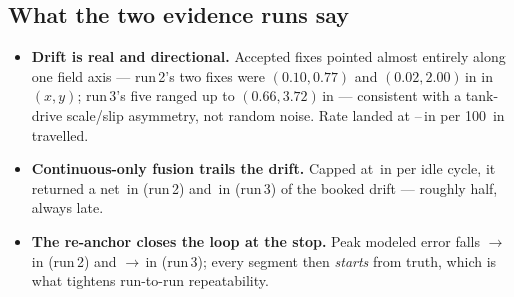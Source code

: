 \documentclass[11pt]{article}
\begin{document}
\subsection{What the two evidence runs say}
\begin{itemize}
  \item \textbf{Drift is real and directional.} Accepted fixes pointed almost
  entirely along one field axis --- run\,2's two fixes were $(0.10, 0.77)$ and
  $(0.02, 2.00)$\,in in $(x,y)$; run\,3's five ranged up to $(0.66, 3.72)$\,in ---
  consistent with a tank-drive scale/slip asymmetry, not random noise. Rate landed at
  \RunThreeDriftPer--\RunTwoDriftPer\,in per \SI{100}{in} travelled.
  \item \textbf{Continuous-only fusion trails the drift.} Capped at \contCap\,in per
  idle cycle, it returned a net \RunTwoNetApplied\,in (run\,2) and
  \RunThreeNetApplied\,in (run\,3) of the booked drift --- roughly half, always late.
  \item \textbf{The re-anchor closes the loop at the stop.} Peak modeled error falls
  \RunTwoRawMax$\to$\RunTwoNewMax\,in (run\,2) and
  \RunThreeRawMax$\to$\RunThreeNewMax\,in (run\,3); every segment then \emph{starts}
  from truth, which is what tightens run-to-run repeatability.
\end{itemize}


\Needspace*{11cm}
\end{document}
